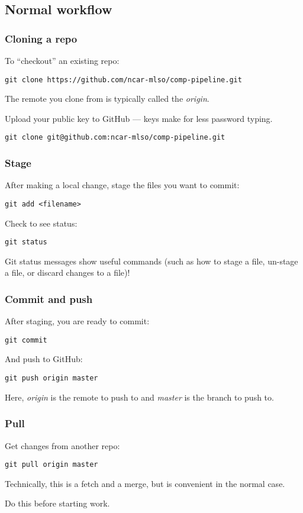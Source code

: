 \documentclass{beamer}
\begin{document}
\subsection{Normal workflow}
\begin{frame}[fragile]
  \frametitle{Cloning a repo}
To ``checkout'' an existing repo:
  \begin{small}
  \begin{lstlisting}
git clone https://github.com/ncar-mlso/comp-pipeline.git
  \end{lstlisting}
  \end{small}
The remote you clone from is typically called the {\em origin}.

\vspace{1em}

Upload your public key to GitHub --- keys make for less password typing.
  \begin{small}
  \begin{lstlisting}
git clone git@github.com:ncar-mlso/comp-pipeline.git
  \end{lstlisting}
  \end{small}
\end{frame}

\begin{frame}[fragile]
  \frametitle{Stage}
After making a local change, stage the files you want to commit:
  \begin{lstlisting}
git add <filename>
  \end{lstlisting}
Check to see status:
  \begin{lstlisting}
git status
  \end{lstlisting}
Git status messages show useful commands (such as how to stage a file, un-stage a file, or discard changes to a file)!
\end{frame}

\begin{frame}[fragile]
  \frametitle{Commit and push}
After staging, you are ready to commit:
  \begin{lstlisting}
git commit
  \end{lstlisting}
And push to GitHub:
  \begin{lstlisting}
git push origin master
  \end{lstlisting}
Here, {\em origin} is the remote to push to and {\em master} is the branch to push to.
\end{frame}

\begin{frame}[fragile]
  \frametitle{Pull}
Get changes from another repo:
  \begin{lstlisting}
git pull origin master
  \end{lstlisting}
Technically, this is a fetch and a merge, but is convenient in the normal case.

\vspace{1em}

Do this before starting work.
\end{frame}
\end{document}
